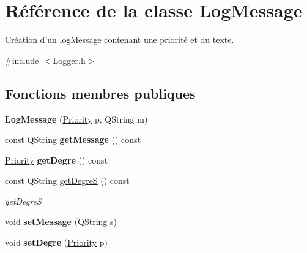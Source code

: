 \hypertarget{class_log_message}{\section{Référence de la classe Log\-Message}
\label{class_log_message}
}


Création d'un log\-Message contenant une priorité et du texte.  




{\ttfamily \#include $<$Logger.\-h$>$}

\subsection*{Fonctions membres publiques}
\begin{DoxyCompactItemize}
\item 
\hypertarget{class_log_message_a877e3559f31a6d3d2bde5af81c463793}{{\bfseries Log\-Message} (\hyperlink{_logger_8h_a315655b1bb5848c063491adffde62b15}{Priority} p, Q\-String m)}\label{class_log_message_a877e3559f31a6d3d2bde5af81c463793}

\item 
\hypertarget{class_log_message_a5eadf0005e94f51be412ef72d352ed6d}{const Q\-String {\bfseries get\-Message} () const }\label{class_log_message_a5eadf0005e94f51be412ef72d352ed6d}

\item 
\hypertarget{class_log_message_a1ad8edf16b9f7d748c2960361d0d7b94}{\hyperlink{_logger_8h_a315655b1bb5848c063491adffde62b15}{Priority} {\bfseries get\-Degre} () const }\label{class_log_message_a1ad8edf16b9f7d748c2960361d0d7b94}

\item 
const Q\-String \hyperlink{class_log_message_a5871b44905b230254daacd1432dddc68}{get\-Degre\-S} () const 
\begin{DoxyCompactList}\small\item\em get\-Degre\-S \end{DoxyCompactList}\item 
\hypertarget{class_log_message_aab0be2a0e35b66bb0d5f8e1dc9701c5d}{void {\bfseries set\-Message} (Q\-String s)}\label{class_log_message_aab0be2a0e35b66bb0d5f8e1dc9701c5d}

\item 
\hypertarget{class_log_message_ab9cfd9695f1e0d486dd2bdeb03f29e8d}{void {\bfseries set\-Degre} (\hyperlink{_logger_8h_a315655b1bb5848c063491adffde62b15}{Priority} p)}\label{class_log_message_ab9cfd9695f1e0d486dd2bdeb03f29e8d}

\end{DoxyCompactItemize}
